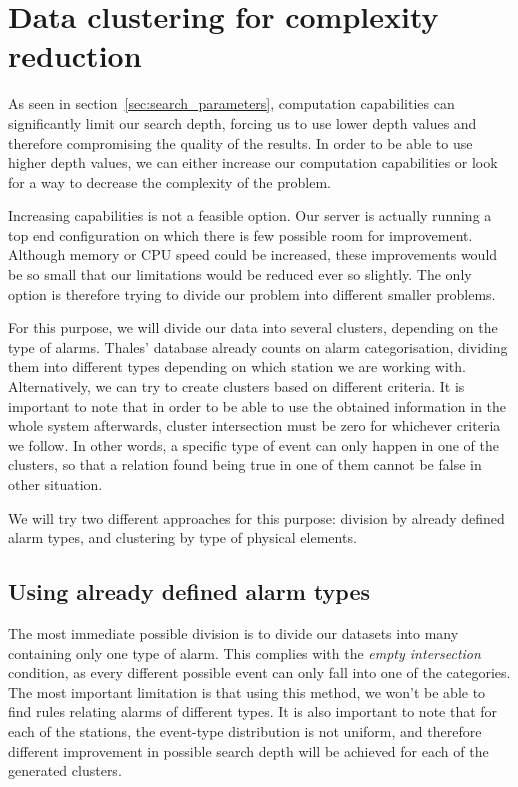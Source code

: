 \documentclass[a4paper,12pt]{article}
\begin{document}
\clearpage
\section{Data clustering for complexity reduction}
\label{sec:dataclustering}
As seen in section~\ref{sec:search_parameters}, computation capabilities can significantly limit our search depth, forcing us to use lower depth values and therefore compromising the quality of the results. In order to be able to use higher depth values, we can either increase our computation capabilities or look for a way to decrease the complexity of the problem.

Increasing capabilities is not a feasible option. Our server is actually running a top end configuration on which there is few possible room for improvement. Although memory or CPU speed could be increased, these improvements would be so small that our limitations would be reduced ever so slightly. The only option is therefore trying to divide our problem into different smaller problems.

For this purpose, we will divide our data into several clusters, depending on the type of alarms. Thales' database already counts on alarm categorisation, dividing them into different types depending on which station we are working with. Alternatively, we can try to create clusters based on different criteria. It is important to note that in order to be able to use the obtained information in the whole system afterwards, cluster intersection must be zero for whichever criteria we follow. In other words, a specific type of event can only happen in one of the clusters, so that a relation found being true in one of them cannot be false in other situation.

We will try two different approaches for this purpose: division by already defined alarm types, and clustering by type of physical elements.

\subsection{Using already defined alarm types}
\label{sec:using_event_type}
The most immediate possible division is to divide our datasets into many containing only one type of alarm. This complies with the \emph{empty intersection} condition, as every different possible event can only fall into one of the categories. The most important limitation is that using this method, we won't be able to find rules relating alarms of different types. It is also important to note that for each of the stations, the event-type distribution is not uniform, and therefore different improvement in possible search depth will be achieved for each of the generated clusters.
\end{document}
